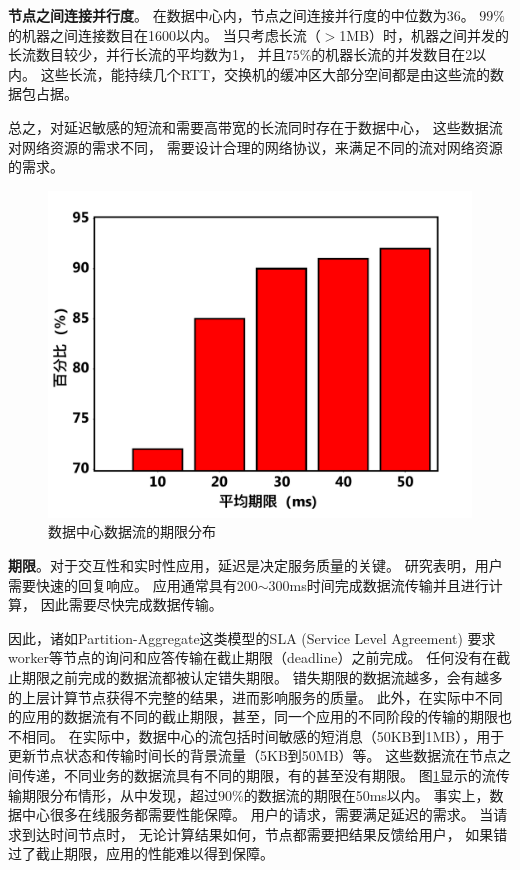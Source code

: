 \textbf{节点之间连接并行度}。
在数据中心内，节点之间连接并行度的中位数为36。
$99\%$的机器之间连接数目在1600以内。
当只考虑长流（$>$1MB）时，机器之间并发的长流数目较少，并行长流的平均数为1，
并且$75\%$的机器长流的并发数目在2以内。
这些长流，能持续几个RTT，交换机的缓冲区大部分空间都是由这些流的数据包占据。

总之，对延迟敏感的短流和需要高带宽的长流同时存在于数据中心，
这些数据流对网络资源的需求不同，
需要设计合理的网络协议，来满足不同的流对网络资源的需求。

\begin{figure}[b]
\begin{center}
\includegraphics [width=0.8\columnwidth] {figures/others/1.pdf}
\caption{数据中心数据流的期限分布}
\label{relatedwork-deadline-fig}
\end{center}
\end{figure}


\textbf{期限}。对于交互性和实时性应用，延迟是决定服务质量的关键。
研究表明，用户需要快速的回复响应\cite{kohavi2009controlled}。
应用通常具有200$\sim$300ms时间完成数据流传输并且进行计算\cite{Decandia2007Dynamo}，
因此需要尽快完成数据传输。

因此，诸如Partition-Aggregate这类模型的SLA (Service Level Agreement)
要求worker等节点的询问和应答传输在截止期限（deadline）之前完成。
任何没有在截止期限之前完成的数据流都被认定错失期限。
错失期限的数据流越多，会有越多的上层计算节点获得不完整的结果，进而影响服务的质量。
此外，在实际中不同的应用的数据流有不同的截止期限，甚至，同一个应用的不同阶段的传输的期限也不相同。
在实际中，数据中心的流包括时间敏感的短消息（50KB到1MB），用于更新节点状态和传输时间长的背景流量（5KB到50MB）等。
这些数据流在节点之间传递，不同业务的数据流具有不同的期限，有的甚至没有期限。
图\ref{relatedwork-deadline-fig}显示的流传输期限分布情形，从中发现，超过$90\%$的数据流的期限在50ms以内。
事实上，数据中心很多在线服务都需要性能保障\cite{Decandia2007Dynamo,Renesse2002Scalable}。
用户的请求，需要满足延迟的需求。
当请求到达时间节点时，
无论计算结果如何，节点都需要把结果反馈给用户，
如果错过了截止期限，应用的性能难以得到保障。



